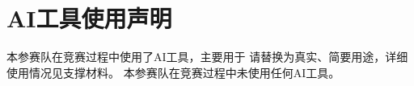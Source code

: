 \section*{AI工具使用声明}

\ifcumcmaiused
\providecommand{\AIUsePurpose}{请替换为真实、简要用途}

本参赛队在竞赛过程中使用了AI工具，主要用于
\AIUsePurpose，详细使用情况见支撑材料。
\else
本参赛队在竞赛过程中未使用任何AI工具。
\fi
